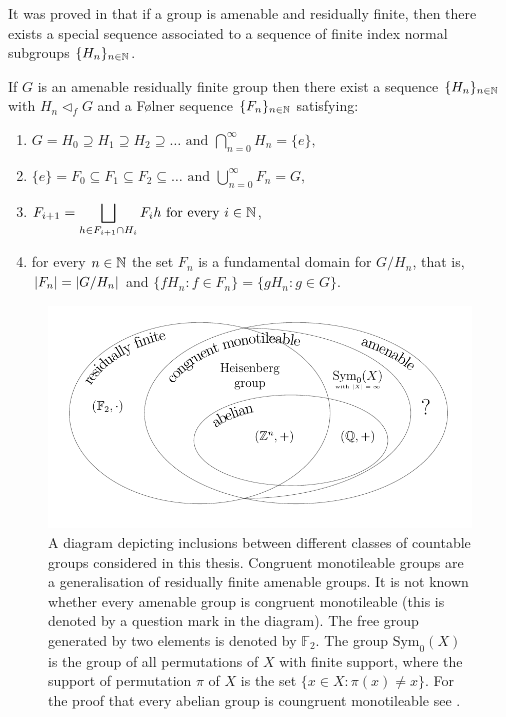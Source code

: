 It was proved in \cite{CP14} that if a group is amenable and residually finite, then there exists a special \Folner sequence associated to a sequence of finite index normal subgroups $\{H_n\}_{n\in\mathbb{N}}$.

\begin{lem}\label{Cortez}\cite[Lemma 4]{CP14}
If $G$ is an amenable residually finite group then there exist
a sequence $\{H_n\}_{n\in \mathbb{N}}$ with $H_n\lhd_f G$ and  a F{\o}lner sequence $\{F_n\}_{n\in\mathbb{N}}$ satisfying:
\begin{enumerate}
\item $\displaystyle G=H_0\supseteq H_1\supseteq H_2\supseteq\ldots\text{ and }\bigcap_{n=0}^{\infty}H_n=\{e\},$
\item $\displaystyle\{e\}=F_0\subseteq F_1\subseteq F_2\subseteq\ldots\text{ and }\bigcup_{n=0}^{\infty}F_n=G,$
\item\label{problem} $\displaystyle F_{i+1}=\bigsqcup_{h\in F_{i+1}\cap H_{i}}F_ih\text{ for every }i\in\mathbb{N}$,
\item for every $n\in\mathbb{N}$ the set $F_n$ is a fundamental domain for $G/H_{n}$, that is, $|F_n|=\left|G/H_n\right|$ and $\{fH_n:f\in F_n\}=\{gH_n:g\in G\}$.
\end{enumerate}
\end{lem}

\begin{figure}
\centering
\includegraphics[scale=1]{../Graphics/grupy}
\caption{A diagram depicting inclusions between different classes of countable groups considered in this thesis. Congruent monotileable groups are a generalisation of residually finite amenable groups. It is not known whether every amenable group is congruent monotileable (this is denoted by a question mark in the diagram). The free group generated by two elements is denoted by $\mathbb{F}_2$. The group $\text{Sym}_0(X)$ is the group of all permutations of $X$ with finite support, where the support of permutation $\pi$ of $X$ is the set $\{x\in X : \pi(x)\neq x \}$. For the proof that every abelian group is coungruent monotileable see \cite{CC19}.}\label{fig:groups}
\end{figure}

